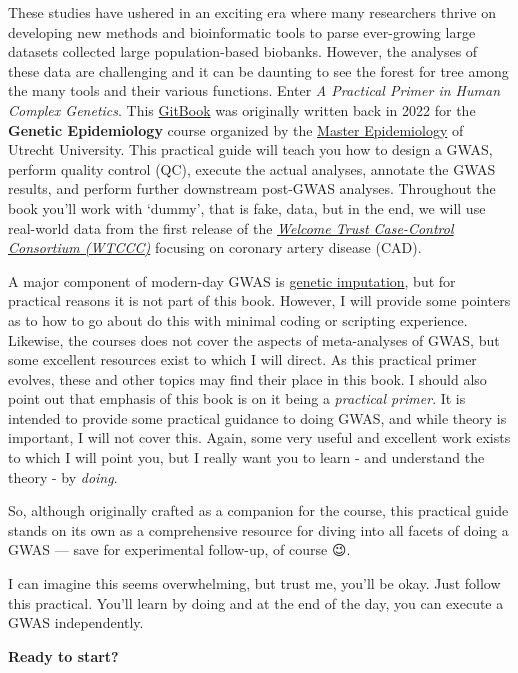 \documentclass[
]{book}
\begin{document}
These studies have ushered in an exciting era where many researchers thrive on developing new methods and bioinformatic tools to parse ever-growing large datasets collected large population-based biobanks. However, the analyses of these data are challenging and it can be daunting to see the forest for tree among the many tools and their various functions. Enter \emph{A Practical Primer in Human Complex Genetics}. This \href{https://cjvanlissa.github.io/gitbook-demo/}{GitBook} was originally written back in 2022 for the \textbf{Genetic Epidemiology} course organized by the \href{https://epidemiology-education.nl}{Master Epidemiology} of Utrecht University. This practical guide will teach you how to design a GWAS, perform quality control (QC), execute the actual analyses, annotate the GWAS results, and perform further downstream post-GWAS analyses. Throughout the book you'll work with `dummy', that is fake, data, but in the end, we will use real-world data from the first release of the \href{https://www.wtccc.org.uk/ccc1/overview.html}{\emph{Welcome Trust Case-Control Consortium (WTCCC)}} focusing on coronary artery disease (CAD).

A major component of modern-day GWAS is \href{https://www.nature.com/articles/nrg2796}{genetic imputation}, but for practical reasons it is not part of this book. However, I will provide some pointers as to how to go about do this with minimal coding or scripting experience. Likewise, the courses does not cover the aspects of meta-analyses of GWAS, but some excellent resources exist to which I will direct. As this practical primer evolves, these and other topics may find their place in this book.
I should also point out that emphasis of this book is on it being a \emph{practical primer}. It is intended to provide some practical guidance to doing GWAS, and while theory is important, I will not cover this. Again, some very useful and excellent work exists to which I will point you, but I really want you to learn - and understand the theory - by \emph{doing}.

So, although originally crafted as a companion for the course, this practical guide stands on its own as a comprehensive resource for diving into all facets of doing a GWAS --- save for experimental follow-up, of course 😉.

I can imagine this seems overwhelming, but trust me, you'll be okay. Just follow this practical. You'll learn by doing and at the end of the day, you can execute a GWAS independently.

\textbf{Ready to start?}
\end{document}
